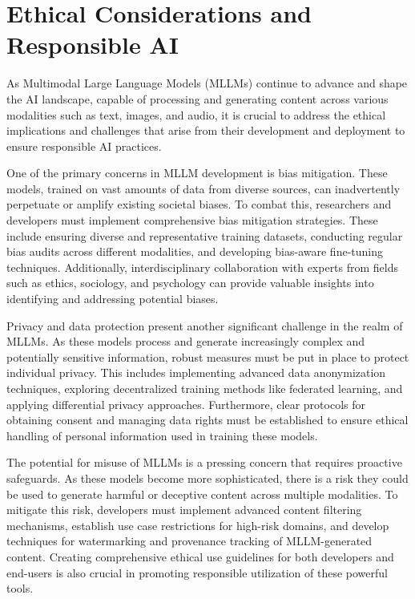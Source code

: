


\chapter{Ethical Considerations and Responsible AI}

As Multimodal Large Language Models (MLLMs) continue to advance and shape the AI landscape, capable of processing and generating content across various modalities such as text, images, and audio, it is crucial to address the ethical implications and challenges that arise from their development and deployment to ensure responsible AI practices. 


One of the primary concerns in MLLM development is bias mitigation. These models, trained on vast amounts of data from diverse sources, can inadvertently perpetuate or amplify existing societal biases. To combat this, researchers and developers must implement comprehensive bias mitigation strategies. These include ensuring diverse and representative training datasets, conducting regular bias audits across different modalities, and developing bias-aware fine-tuning techniques. Additionally, interdisciplinary collaboration with experts from fields such as ethics, sociology, and psychology can provide valuable insights into identifying and addressing potential biases.

Privacy and data protection present another significant challenge in the realm of MLLMs. As these models process and generate increasingly complex and potentially sensitive information, robust measures must be put in place to protect individual privacy. This includes implementing advanced data anonymization techniques, exploring decentralized training methods like federated learning, and applying differential privacy approaches. Furthermore, clear protocols for obtaining consent and managing data rights must be established to ensure ethical handling of personal information used in training these models.

The potential for misuse of MLLMs is a pressing concern that requires proactive safeguards. As these models become more sophisticated, there is a risk they could be used to generate harmful or deceptive content across multiple modalities. To mitigate this risk, developers must implement advanced content filtering mechanisms, establish use case restrictions for high-risk domains, and develop techniques for watermarking and provenance tracking of MLLM-generated content. Creating comprehensive ethical use guidelines for both developers and end-users is also crucial in promoting responsible utilization of these powerful tools.

